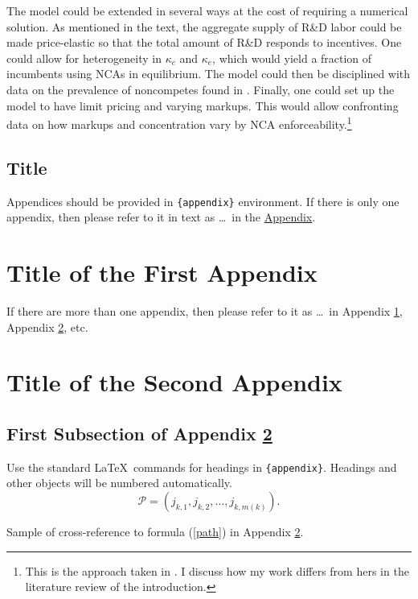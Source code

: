 \documentclass[ecta,nameyear,final]{econsocart}
\theoremstyle{plain}
\theoremstyle{remark}
\begin{document}
The model could be extended in several ways at the cost of requiring a numerical solution. As mentioned in the text, the aggregate supply of R\&D labor could be made price-elastic so that the total amount of R\&D responds to incentives. One could allow for heterogeneity in $\kappa_c$ and $\kappa_e$, which would yield a fraction of incumbents using NCAs in equilibrium. The model could then be disciplined with data on the prevalence of noncompetes found in \cite{starr_noncompetes_2019}. Finally, one could set up the model to have limit pricing and varying markups. This would allow confronting data on how markups and concentration vary by NCA enforceability.\footnote{This is the approach taken in \cite{baslandze_spinout_2019}. I discuss how my work differs from hers in the literature review of the introduction.}


\begin{appendix}
\section*{Title}\label{appn} %
Appendices should be provided in \verb|{appendix}| environment. If there is only one appendix,
then please refer to it in text as \ldots\ in the \hyperref[appn]{Appendix}.
\end{appendix}

\begin{appendix}
\section{Title of the First Appendix}\label{appA}
If there are more than one appendix, then please refer to it
as \ldots\ in Appendix \ref{appA}, Appendix \ref{appB}, etc.

\section{Title of the Second Appendix}\label{appB}
\subsection{First Subsection of Appendix \protect\ref{appB}}

Use the standard \LaTeX\ commands for headings in \verb|{appendix}|.
Headings and other objects will be numbered automatically.
\begin{equation}
\mathcal{P}=(j_{k,1},j_{k,2},\dots,j_{k,m(k)}). \label{path}
\end{equation}

Sample of cross-reference to formula (\ref{path}) in Appendix \ref{appB}.
\end{appendix}
\end{document}
